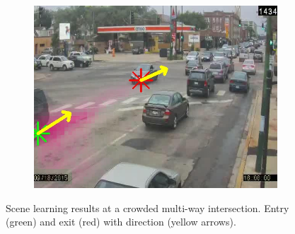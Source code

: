 \begin{figure}
\begin{subfigure}{0.32\linewidth}
            \includegraphics[width=\linewidth]{./img/scene_learning/res/diverseyWestern/diverseyWestern-5.jpg}
        \end{subfigure}
        \caption{Scene learning results at a crowded multi-way intersection. Entry (green) and exit (red) with direction (yellow arrows).}
        \label{fig:entry-exit-full-3}
\end{figure}